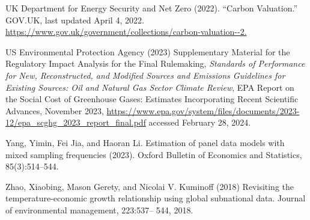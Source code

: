 \documentclass[12pt,paper=a4,DIV=12,parskip=never,chapterprefix=false,headings=standardclasses]{scrreprt}
\begin{document}
UK Department for Energy Security and Net Zero (2022). “Carbon Valuation.” GOV.UK, last updated
April 4, 2022. \url{https://www.gov.uk/government/collections/carbon-valuation--2.}

US Environmental Protection Agency (2023) Supplementary Material for the Regulatory Impact Analysis
for the Final Rulemaking, \emph{Standards of Performance for New, Reconstructed, and Modified Sources
and Emissions Guidelines for Existing Sources: Oil and Natural Gas Sector Climate Review}, EPA
Report on the Social Cost of Greenhouse Gases: Estimates Incorporating Recent Scientific Advances,
November 2023, \url{https://www.epa.gov/system/files/documents/2023-
12/epa_scghg_2023_report_final.pdf} accessed February 28, 2024.

Yang, Yimin, Fei Jia, and Haoran Li. Estimation of panel data models with mixed sampling frequencies
(2023). Oxford Bulletin of Economics and Statistics, 85(3):514–544.

Zhao, Xiaobing, Mason Gerety, and Nicolai V. Kuminoff (2018) Revisiting the temperature-economic
growth relationship using global subnational data. Journal of environmental management, 223:537–
544, 2018.

\endgroup

\cleardoublepage
\end{document}
